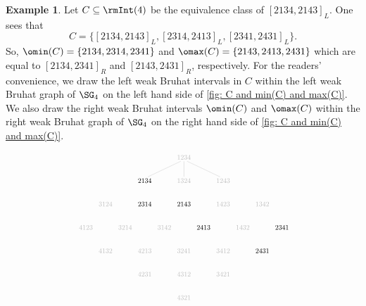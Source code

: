 \documentclass[12pt, reqno]{amsart}
\theoremstyle{definition}
\newtheorem{example}[theorem]{Example}
\numberwithin{equation}{section} \numberwithin{figure}{section}
\numberwithin{table}{section}
\begin{document}
\begin{example}\label{eg: C and min(C) and max(C)}
Let $C \subseteq \rmInt(4)$ be the equivalence class of $[2134, 2143]_L$.
One sees that 
\[
C = \{[2134, 2143]_L, [2314, 2413]_L, [2341, 2431]_L\}.
\]
So, $\omin(C) = \{2134,2314,2341\}$ and $\omax(C) = \{2143,2413,2431\}$ which are equal to $[2134, 2341]_R$ and $[2143,2431]_R$, respectively.
For the readers' convenience, we draw the left weak Bruhat intervals in $C$ within the left weak Bruhat graph of $\SG_4$ on the left hand side of \cref{fig: C and min(C) and max(C)}.
We also draw the right weak Bruhat intervals $\omin(C)$ and $\omax(C)$ within the right weak Bruhat graph of $\SG_4$ on the right hand side of \cref{fig: C and min(C) and max(C)}.
\end{example}

\begin{figure}[t]
\centering
\[
\def \hp{0.25}
\def \wp{0.2}
\def \wtab{2.5}
\def \htab{1.5}
\scalebox{0.7}{
\begin{tikzpicture}[baseline = 0mm, scale = 0.8]
\node at (0,0) {\color{lightgray}$4321$};
\node at (-\wtab,1*\htab) {\color{lightgray}$4231$};
\node at (0,1*\htab) {\color{lightgray}$4312$};
\node at (\wtab,1*\htab) {\color{lightgray}$3421$};
\node at (-\wtab*2,2*\htab) {\color{lightgray}$4132$};
\node at (-\wtab,2*\htab) {\color{lightgray}$4213$};
\node at (0,2*\htab) {\color{lightgray}$3241$};
\node at (\wtab,2*\htab) {\color{lightgray}$3412$};
\node at (\wtab*2,2*\htab) {\color{black}$2431$};


\node at (-\wtab/2*5,3*\htab) {\color{lightgray}$4123$};
\node at (-\wtab/2*3,3*\htab) {\color{lightgray}$3214$};
\node at (-\wtab/2,3*\htab) {\color{lightgray}$3142$};
\node at (\wtab/2,3*\htab) {\color{black}$2413$};
\node at (\wtab/2*3,3*\htab) {\color{lightgray}$1432$};
\node at (\wtab/2*5,3*\htab) {\color{black}$2341$};
\node at (-\wtab*2,4*\htab) {\color{lightgray}$3124$};
\node at (-\wtab,4*\htab) {\color{black}$2314$};
\node at (0,4*\htab) {\color{black}$2143$};

\node at (\wtab,4*\htab) {\color{lightgray}$1423$};
\node at (\wtab*2,4*\htab) {\color{lightgray}$1342$};
\node at (-\wtab,5*\htab) {\color{black}$2134$};
\node at (0,5*\htab) {\color{lightgray}$1324$};
\node at (\wtab,5*\htab) {\color{lightgray}$1243$};
\node at (0,6*\htab) {\color{lightgray}$1234$};

\draw [lightgray] (-\wp,6*\htab-\hp) -- (-\wtab+\wp,5*\htab+\hp);
\draw [lightgray] (0,6*\htab-\hp) -- (0,5*\htab+\hp);
\draw [lightgray] (\wp, 6*\htab -\hp) -- (\wtab-\wp,5*\htab+\hp);


\end{tikzpicture}}\]
\end{figure}
\end{document}
